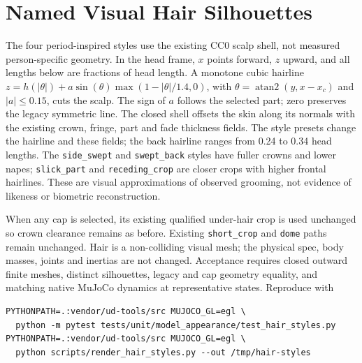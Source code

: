 \section{Named Visual Hair Silhouettes}
The four period-inspired styles use the existing CC0 scalp shell, not measured
person-specific geometry.  In the head frame, $x$ points forward, $z$ upward,
and all lengths below are fractions of head length.  A monotone cubic
hairline $z=h(|\theta|)+a\sin(\theta)\max(1-|\theta|/1.4,0)$, with
$\theta=\operatorname{atan2}(y,x-x_c)$ and $|a|\leq 0.15$, cuts
the scalp. The sign of $a$ follows the selected part; zero preserves the
legacy symmetric line. The closed
shell offsets the skin along its normals with the existing crown, fringe,
part and fade thickness fields.  The style presets change the hairline and
these fields; the back hairline ranges from 0.24 to 0.34 head lengths.
The \texttt{side\_swept} and \texttt{swept\_back} styles have fuller crowns
and lower napes; \texttt{slick\_part} and \texttt{receding\_crop} are closer
crops with higher frontal hairlines.  These are visual approximations of
observed grooming, not evidence of likeness or biometric reconstruction.

When any cap is selected, its existing qualified under-hair crop is used
unchanged so crown clearance remains as before. Existing \texttt{short\_crop}
and \texttt{dome} paths remain unchanged. Hair is a non-colliding visual
mesh; the physical spec, body masses, joints and inertias are not changed.
Acceptance requires closed outward finite meshes, distinct silhouettes,
legacy and cap geometry equality, and matching native MuJoCo dynamics at
representative states. Reproduce with
\begin{verbatim}
PYTHONPATH=.:vendor/ud-tools/src MUJOCO_GL=egl \
  python -m pytest tests/unit/model_appearance/test_hair_styles.py
PYTHONPATH=.:vendor/ud-tools/src MUJOCO_GL=egl \
  python scripts/render_hair_styles.py --out /tmp/hair-styles
\end{verbatim}
